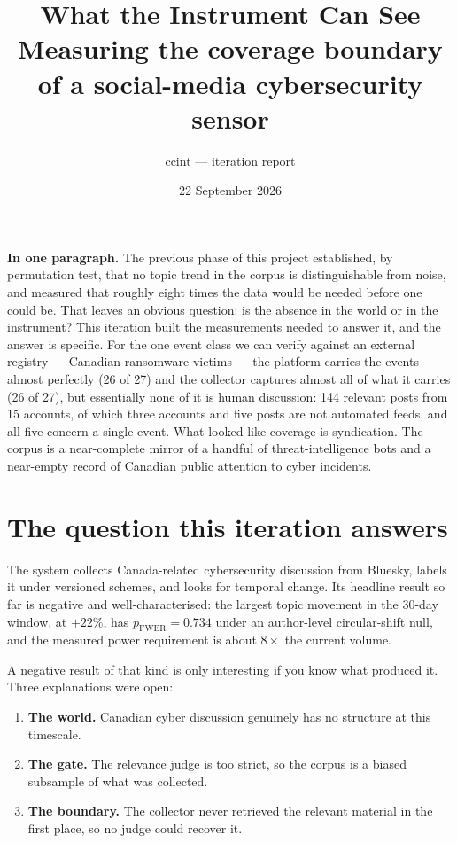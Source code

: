 \documentclass[11pt]{article}
\title{\vspace{-1.6cm}\textbf{\color{accent}What the Instrument Can See}\\[2pt]
\large\color{ink} Measuring the coverage boundary of a social-media
cybersecurity sensor}
\author{\normalsize ccint --- iteration report}
\date{\normalsize 22 September 2026}
\begin{document}
\maketitle
\thispagestyle{fancy}
\vspace{-0.8cm}

\begin{keybox}
\textbf{In one paragraph.} The previous phase of this project established, by
permutation test, that no topic trend in the corpus is distinguishable from
noise, and measured that roughly eight times the data would be needed before
one could be. That leaves an obvious question: is the absence in the world or
in the instrument? This iteration built the measurements needed to answer it,
and the answer is specific. For the one event class we can verify against an
external registry --- Canadian ransomware victims --- the platform carries the
events almost perfectly (26 of 27) and the collector captures almost all of
what it carries (26 of 27), but essentially none of it is human discussion:
144 relevant posts from 15 accounts, of which three accounts and five posts
are not automated feeds, and all five concern a single event. What looked like
coverage is syndication. The corpus is a near-complete mirror of a handful of
threat-intelligence bots and a near-empty record of Canadian public attention
to cyber incidents.
\end{keybox}

\section{The question this iteration answers}

The system collects Canada-related cybersecurity discussion from Bluesky,
labels it under versioned schemes, and looks for temporal change. Its
headline result so far is negative and well-characterised: the largest
topic movement in the 30-day window,  at $+22\%$, has
$p_{\mathrm{FWER}} = 0.734$ under an author-level circular-shift null, and the
measured power requirement is about $8\times$ the current volume.

A negative result of that kind is only interesting if you know what produced
it. Three explanations were open:

\begin{enumerate}[leftmargin=1.4em,itemsep=2pt]
\item \textbf{The world.} Canadian cyber discussion genuinely has no structure
      at this timescale.
\item \textbf{The gate.} The relevance judge is too strict, so the corpus is a
      biased subsample of what was collected.
\item \textbf{The boundary.} The collector never retrieved the relevant
      material in the first place, so no judge could recover it.
\end{enumerate}
\end{document}
